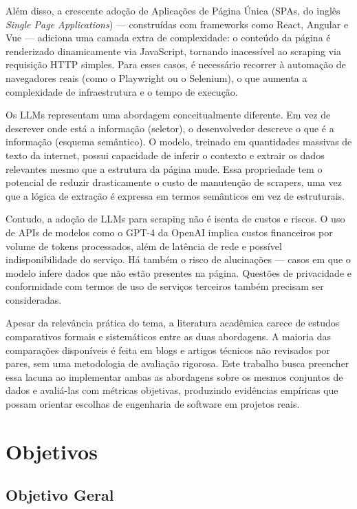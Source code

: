 \documentclass[tcc,capa]{texifsul}
\begin{document}
Além disso, a crescente adoção de Aplicações de Página Única (SPAs, do inglês \textit{Single Page Applications}) — construídas com frameworks como React, Angular e Vue — adiciona uma camada extra de complexidade: o conteúdo da página é renderizado dinamicamente via JavaScript, tornando inacessível ao scraping via requisição HTTP simples. Para esses casos, é necessário recorrer à automação de navegadores reais (como o Playwright ou o Selenium), o que aumenta a complexidade de infraestrutura e o tempo de execução.

Os LLMs representam uma abordagem conceitualmente diferente. Em vez de descrever onde está a informação (seletor), o desenvolvedor descreve o que é a informação (esquema semântico). O modelo, treinado em quantidades massivas de texto da internet, possui capacidade de inferir o contexto e extrair os dados relevantes mesmo que a estrutura da página mude. Essa propriedade tem o potencial de reduzir drasticamente o custo de manutenção de scrapers, uma vez que a lógica de extração é expressa em termos semânticos em vez de estruturais.

Contudo, a adoção de LLMs para scraping não é isenta de custos e riscos. O uso de APIs de modelos como o GPT-4 da OpenAI implica custos financeiros por volume de tokens processados, além de latência de rede e possível indisponibilidade do serviço. Há também o risco de alucinações — casos em que o modelo infere dados que não estão presentes na página. Questões de privacidade e conformidade com termos de uso de serviços terceiros também precisam ser consideradas.

Apesar da relevância prática do tema, a literatura acadêmica carece de estudos comparativos formais e sistemáticos entre as duas abordagens. A maioria das comparações disponíveis é feita em blogs e artigos técnicos não revisados por pares, sem uma metodologia de avaliação rigorosa. Este trabalho busca preencher essa lacuna ao implementar ambas as abordagens sobre os mesmos conjuntos de dados e avaliá-las com métricas objetivas, produzindo evidências empíricas que possam orientar escolhas de engenharia de software em projetos reais.

\chapter{Objetivos}
\label{cap:objetivos}

\section{Objetivo Geral}
\end{document}
